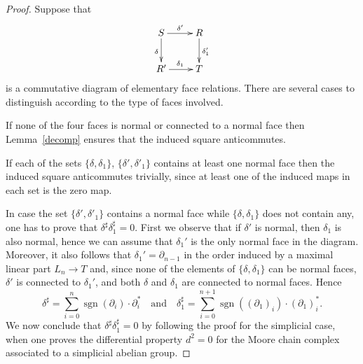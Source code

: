 \documentclass[a4paper]{amsart}
\theoremstyle{plain}
\theoremstyle{definition}
\theoremstyle{remark}
\DeclareMathOperator{\sgn}{sgn}
\newcommand{\To}{\longrightarrow}
\numberwithin{equation}{section}
\numberwithin{figure}{section}
\begin{document}
\begin{proof} Suppose that
\[
\xymatrix{
S\ar[r]^{\delta'}\ar[d]_\delta & R \ar[d]^{\delta'_1} \\
R'\ar[r]^{\delta_1} & T }
\]
is a commutative diagram of elementary face relations. There are several cases to distinguish according to the type of faces involved.

If none of the four faces is normal or connected to a normal face then Lemma~\ref{decomp} ensures that the induced square anticommutes.

If each of the sets $\{\delta,\delta_1\}$, $\{\delta', \delta'_1\}$ contains at least one normal face then the induced square anticommutes trivially, since at least one of the induced maps in each set is the zero map.

In case the set $\{\delta',\delta'_1\}$ contains a normal face while $\{\delta, \delta_1\}$ does not contain any, one has to prove that $\delta^\sharp\delta_1^\sharp=0$. First we observe that if $\delta'$ is normal, then $\delta_1$ is also normal, hence we can assume that
$\delta_1'$ is the only normal face in the diagram. Moreover, it also follows that $\delta_1'=\partial_{n-1}$ in the order induced by a maximal linear part $L_n\To T$ and, since none of the elements of $\{\delta,\delta_1\}$ can be normal faces, $\delta'$ is connected to $\delta_1'$, and both $\delta$ and $\delta_1$ are connected to normal faces. Hence
\[
\delta^\sharp=\sum_{i=0}^n\sgn(\partial_i)\cdot\partial_i^*\quad\mbox{and}\quad
\delta_1^\sharp=\sum_{i=0}^{n+1}\sgn((\partial_1)_i)\cdot(\partial_1)_i^*.
\]
We now conclude that $\delta^\sharp\delta_1^\sharp=0$ by following the
proof for the simplicial case, when one proves the differential
property $d^2=0$ for the Moore chain complex associated to a
simplicial abelian group.


\end{proof}
\end{document}
